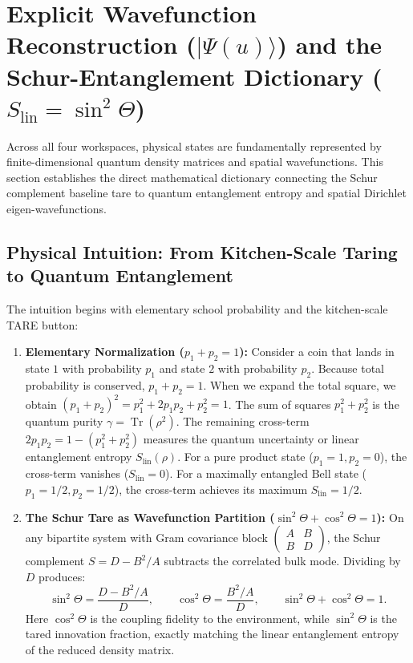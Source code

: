 \documentclass[11pt,a4paper]{article}
\begin{document}
\section{Explicit Wavefunction Reconstruction ($|\Psi(u)\rangle$) and the Schur-Entanglement Dictionary ($S_{\mathrm{lin}} = \sin^2\Theta$)}

Across all four workspaces, physical states are fundamentally represented by finite-dimensional quantum density matrices and spatial wavefunctions. This section establishes the direct mathematical dictionary connecting the Schur complement baseline tare to quantum entanglement entropy and spatial Dirichlet eigen-wavefunctions.

\subsection{Physical Intuition: From Kitchen-Scale Taring to Quantum Entanglement}
The intuition begins with elementary school probability and the kitchen-scale TARE button:
\begin{enumerate}
  \item \textbf{Elementary Normalization ($p_1 + p_2 = 1$):} Consider a coin that lands in state $1$ with probability $p_1$ and state $2$ with probability $p_2$. Because total probability is conserved, $p_1 + p_2 = 1$. When we expand the total square, we obtain $(p_1 + p_2)^2 = p_1^2 + 2p_1 p_2 + p_2^2 = 1$. The sum of squares $p_1^2 + p_2^2$ is the quantum purity $\gamma = \operatorname{Tr}(\rho^2)$. The remaining cross-term $2p_1 p_2 = 1 - (p_1^2 + p_2^2)$ measures the quantum uncertainty or linear entanglement entropy $S_{\mathrm{lin}}(\rho)$. For a pure product state ($p_1=1, p_2=0$), the cross-term vanishes ($S_{\mathrm{lin}} = 0$). For a maximally entangled Bell state ($p_1 = 1/2, p_2 = 1/2$), the cross-term achieves its maximum $S_{\mathrm{lin}} = 1/2$.
  \item \textbf{The Schur Tare as Wavefunction Partition ($\sin^2\Theta + \cos^2\Theta = 1$):} On any bipartite system with Gram covariance block $\begin{pmatrix} A & B \\ B & D \end{pmatrix}$, the Schur complement $S = D - B^2/A$ subtracts the correlated bulk mode. Dividing by $D$ produces:
  \[
    \sin^2\Theta = \frac{D - B^2/A}{D}, \qquad \cos^2\Theta = \frac{B^2/A}{D}, \qquad \sin^2\Theta + \cos^2\Theta = 1.
  \]
  Here $\cos^2\Theta$ is the coupling fidelity to the environment, while $\sin^2\Theta$ is the tared innovation fraction, exactly matching the linear entanglement entropy of the reduced density matrix.
\end{enumerate}
\end{document}
